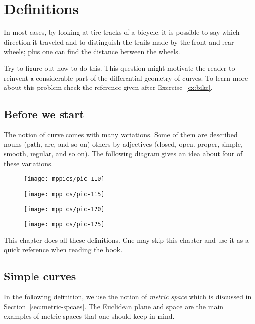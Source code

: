\chapter{Definitions}
\label{chap:curves-def}

In most cases, by looking at tire tracks of a bicycle,
it is possible to say which direction it traveled and to distinguish the trails made by the front and rear wheels;
plus one can find the distance between the wheels.

Try to figure out how to do this.
This question might motivate the reader to reinvent a considerable part of the differential geometry of curves.
To learn more about this problem check the reference given after Exercise~\ref{ex:bike}.

\section{Before we start}

The notion of curve comes with many variations.
Some of them are described nouns (path, arc, and so on)
others by adjectives (closed, open, proper, simple, smooth, regular, and so on).
The following diagram gives an idea about four of these variations.

\vskip-0mm
\begin{figure}[h!]
\begin{minipage}{.48\textwidth}
\centering
\texttt{[image: mppics/pic-110]}
\end{minipage}\hfill
\begin{minipage}{.48\textwidth}
\centering
\texttt{[image: mppics/pic-115]}
\end{minipage}
\bigskip
\begin{minipage}{.48\textwidth}
\centering
\texttt{[image: mppics/pic-120]}
\end{minipage}\hfill
\begin{minipage}{.48\textwidth}
\centering
\texttt{[image: mppics/pic-125]}
\end{minipage}
\end{figure}
\vskip-0mm

This chapter does all these definitions.
One may skip this chapter and use it as a quick reference when reading the book.

\section{Simple curves}

In the following definition, we use the notion of {}\emph{metric space} which is discussed in Section~\ref{sec:metric-spcaes}.
The Euclidean plane and space are the main examples of metric spaces that one should keep in mind.

